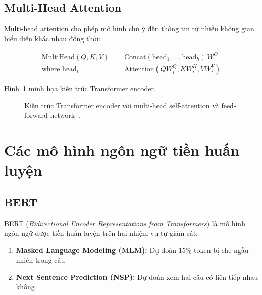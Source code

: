 \documentclass[12pt, a4paper]{report}
\begin{document}
\subsection{Multi-Head Attention}

Multi-head attention cho phép mô hình chú ý đến thông tin từ nhiều
không gian biểu diễn khác nhau đồng thời:

\begin{align}
  \text{MultiHead}(Q,K,V) &= \text{Concat}(\text{head}_1, \ldots, \text{head}_h)\,W^O \\
  \text{where head}_i     &= \text{Attention}(QW_i^Q, KW_i^K, VW_i^V)
\end{align}

Hình~\ref{fig:transformer} minh họa kiến trúc Transformer encoder.

\begin{figure}[htbp]
  \centering
  \caption{Kiến trúc Transformer encoder với multi-head self-attention
           và feed-forward network~\cite{Vaswani2017attention}.}
  \label{fig:transformer}
\end{figure}

\section{Các mô hình ngôn ngữ tiền huấn luyện}
\label{sec:plm}

\subsection{BERT}

BERT (\textit{Bidirectional Encoder Representations from Transformers})
\cite{Vaswani2017attention} là mô hình ngôn ngữ được tiền huấn luyện
trên hai nhiệm vụ tự giám sát:

\begin{enumerate}
  \item \textbf{Masked Language Modeling (MLM):} Dự đoán 15\% token
        bị che ngẫu nhiên trong câu
  \item \textbf{Next Sentence Prediction (NSP):} Dự đoán xem hai câu
        có liên tiếp nhau không
\end{enumerate}
\end{document}
